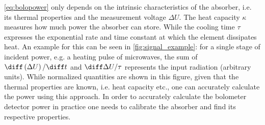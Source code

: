 %
                \autoref{eq:bolopower} only depends on the intrinsic characteristics of the absorber, i.e. its thermal properties and the measurement voltage $\Delta U$. The heat capacity $\kappa$ measures how much power the absorber can store. While the cooling time $\tau$ expresses the exponential rate and time constant at which the element dissipates heat. An example for this can be seen in \cref{fig:signal_example}: for a single stage of incident power, e.g. a heating pulse of microwaves, the sum of $\diff\left(\Delta U\right)/\diff t$ and $\diff\Delta U/\tau$ represents the input radiation (arbitrary units). While normalized quantities are shown in this figure, given that the thermal properties are known, i.e. heat capacity etc., one can accurately calculate the power using this approach. In order to accurately calculate the bolometer detector power in practice one needs to calibrate the absorber and find its respective properties.%
%
